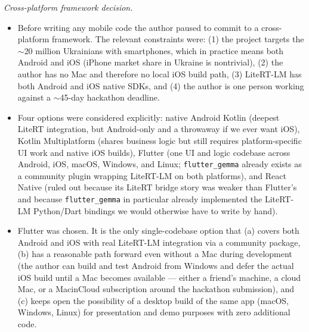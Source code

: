 \documentclass{article}
\theoremstyle{plain}
\theoremstyle{definition}
\theoremstyle{remark}
\begin{document}
\textit{Cross-platform framework decision.}
\begin{itemize}
\item Before writing any mobile code the author paused to commit to a cross-platform framework. The relevant constraints were: (1) the project targets the $\sim$20 million Ukrainians with smartphones, which in practice means both Android and iOS (iPhone market share in Ukraine is nontrivial), (2) the author has no Mac and therefore no local iOS build path, (3) LiteRT-LM has both Android and iOS native SDKs, and (4) the author is one person working against a $\sim$45-day hackathon deadline.
\item Four options were considered explicitly: native Android Kotlin (deepest LiteRT integration, but Android-only and a throwaway if we ever want iOS), Kotlin Multiplatform (shares business logic but still requires platform-specific UI work and native iOS builds), Flutter (one UI and logic codebase across Android, iOS, macOS, Windows, and Linux; \texttt{flutter\_gemma} already exists as a community plugin wrapping LiteRT-LM on both platforms), and React Native (ruled out because its LiteRT bridge story was weaker than Flutter's and because \texttt{flutter\_gemma} in particular already implemented the LiteRT-LM Python/Dart bindings we would otherwise have to write by hand).
\item Flutter was chosen. It is the only single-codebase option that (a) covers both Android and iOS with real LiteRT-LM integration via a community package, (b) has a reasonable path forward even without a Mac during development (the author can build and test Android from Windows and defer the actual iOS build until a Mac becomes available --- either a friend's machine, a cloud Mac, or a MacinCloud subscription around the hackathon submission), and (c) keeps open the possibility of a desktop build of the same app (macOS, Windows, Linux) for presentation and demo purposes with zero additional code.
\end{itemize}
\end{document}
